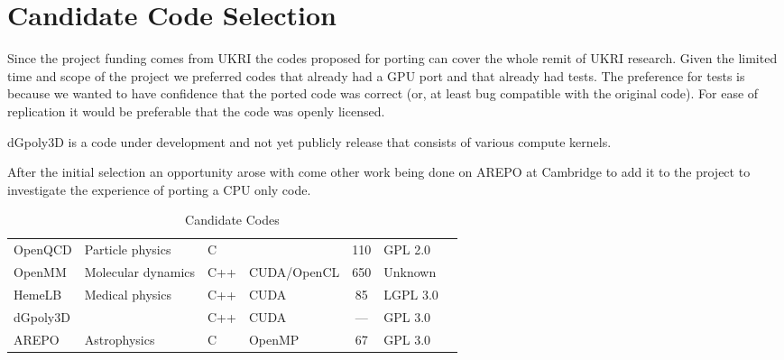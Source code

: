 \documentclass[main]{subfiles}
\begin{document}
\section{Candidate Code Selection}\label{sec:codesel}
Since the project funding comes from UKRI the codes proposed for porting can cover the whole remit of UKRI research.
Given the limited time and scope of the project we preferred codes that already had a GPU port and that already had tests.
The preference for tests is because we wanted to have confidence that the ported code was correct (or, at least bug compatible with the original code).
For ease of replication it would be preferable that the code was openly licensed.

dGpoly3D is a code under development and not yet publicly release that consists of various compute kernels.

After the initial selection an opportunity arose with come other work being done on AREPO at Cambridge to add it to the project to investigate the experience of porting a CPU only code.

\begin{table}[!htbp]
	\begin{tabular}{@{}llllSlc@{}}
		\toprule
		 &      &  &  & {}      &  &                                         \\
		\midrule
		OpenQCD      & Particle physics   & C                &                    & \qty{110}{\kilo{}} & GPL 2.0         & \cite{fastsum_collaboration_openqcd-fastsum_nodate} \\
		OpenMM       & Molecular dynamics & C++              & CUDA/OpenCL        & \qty{650}{\kilo{}} & Unknown         & \cite{noauthor_openmm_nodate}                       \\
		HemeLB       & Medical physics    & C++              & CUDA               & \qty{85}{\kilo{}}  & LGPL 3.0        & \cite{hemelb_authors_hemelb_nodate}                 \\
		dGpoly3D     &                    & C++              & CUDA               & {---}              & GPL 3.0         & \cite{dgpoly3d_nodate}                              \\
		AREPO        & Astrophysics       & C                & OpenMP             & \qty{67}{\kilo{}}  & GPL 3.0         & \cite{weinberger_arepo_2020}                        \\
		\bottomrule
	\end{tabular}
	\caption{Candidate Codes}
	\label{tab:candidate codes}
\end{table}
\end{document}

